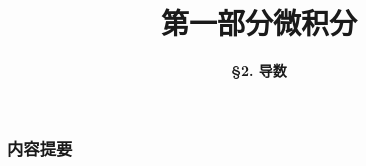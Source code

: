 

\title[Calculus]{\LARGE \bfseries 第一部分\quad 微积分} %
\author[Derivative] %
{\Large \bfseries \S 2. 导数
}
\date{}



\begin{frame}
\titlepage %
\end{frame}

\begin{frame}
\frametitle{内容提要} %
\tableofcontents %
\end{frame}


